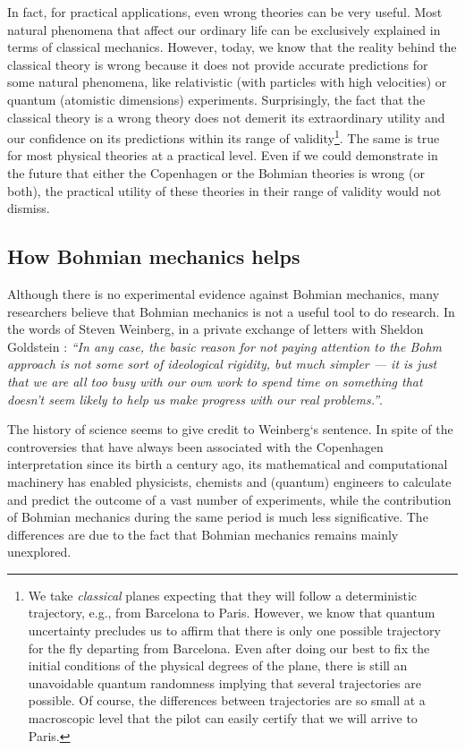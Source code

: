 \documentclass[nofootinbib, secnumarabic, amsmath, nobibnotes,11pt,aps,pra, floatfix]{revtex4-1}
\begin{document}
In fact, for practical applications, even wrong theories can be very useful. Most natural phenomena that affect our ordinary life can be exclusively explained in terms of classical mechanics. However, today, we know that the reality behind the classical theory is wrong because it does not provide accurate predictions for some natural phenomena, like relativistic (with particles with high velocities) or quantum (atomistic dimensions) experiments.  Surprisingly, the fact that the classical theory is a wrong theory does not demerit its extraordinary utility and our confidence on its predictions within its range of validity\footnote{We take \emph{classical} planes expecting that they will follow a deterministic trajectory, e.g., from Barcelona to Paris. However, we know that quantum uncertainty precludes us to affirm that there is only one possible trajectory for the fly departing from Barcelona. Even after doing our best to fix the initial conditions of the physical degrees of the plane, there is still an unavoidable quantum randomness implying that several trajectories are possible. Of course, the differences between trajectories are so small at a macroscopic level that the pilot can easily certify that we will arrive to Paris.}. The same is true for most physical theories at a practical level. Even if we could demonstrate in the future that either the Copenhagen or the Bohmian theories is wrong (or both), the practical utility of these theories in their range of validity would not dismiss.  


\subsection{How Bohmian mechanics helps}\label{sec_why}

Although there is no experimental evidence against Bohmian mechanics, many researchers believe that Bohmian mechanics is not a useful tool to do research. In the words of Steven Weinberg, in a private exchange of letters with Sheldon Goldstein \cite{om.Weinberg}: \textit{``In any case, the basic reason for not paying attention to the Bohm approach is not some sort of ideological rigidity, but much simpler --- it is just that we are all too busy with our own work to spend time on something that doesn't seem likely to help us make progress with our real problems.''}.

The history of science seems to give credit to Weinberg`s sentence. In spite of the controversies that have always been associated with the Copenhagen interpretation since its birth a century ago, its mathematical and computational machinery has enabled physicists, chemists and (quantum) engineers to calculate and predict the outcome of a vast number of experiments, while the contribution of Bohmian mechanics during the same period is much less significative. The differences are due to the fact that Bohmian mechanics remains mainly unexplored.
\end{document}

